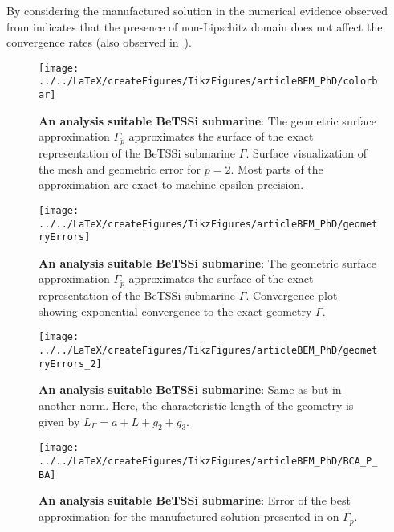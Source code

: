 By considering the manufactured solution in  the numerical evidence observed from  indicates that the presence of non-Lipschitz domain does not affect the convergence rates (also observed in~\cite{Lipton2010roi}).
\begin{figure}
	\centering    
	\texttt{[image: ../../LaTeX/createFigures/TikzFigures/articleBEM\_PhD/colorbar]}
	\caption{\textbf{An analysis suitable BeTSSi submarine}: The geometric surface approximation $\Gamma_{\check{p}}$ approximates the surface of the exact representation of the BeTSSi submarine $\Gamma$. Surface visualization of the mesh and geometric error for $\check{p}=2$. Most parts of the approximation are exact to machine epsilon precision.}
	\label{Fig3:geometricError}
\end{figure}
\begin{figure}
	\centering    
	\texttt{[image: ../../LaTeX/createFigures/TikzFigures/articleBEM\_PhD/geometryErrors]}
	\caption{\textbf{An analysis suitable BeTSSi submarine}: The geometric surface approximation $\Gamma_{\check{p}}$ approximates the surface of the exact representation of the BeTSSi submarine $\Gamma$. Convergence plot showing exponential convergence to the exact geometry $\Gamma$.}
	\label{Fig3:geometricErrorsL2_1}
\end{figure}
\begin{figure}
	\centering    
	\texttt{[image: ../../LaTeX/createFigures/TikzFigures/articleBEM\_PhD/geometryErrors\_2]}
	\caption{\textbf{An analysis suitable BeTSSi submarine}: Same as  but in another norm. Here, the characteristic length of the geometry is given by $L_\Gamma = a+L+g_2+g_3$.}
	\label{Fig3:geometricErrorsL2_2}
\end{figure}
\begin{figure}
	\centering    
	\texttt{[image: ../../LaTeX/createFigures/TikzFigures/articleBEM\_PhD/BCA\_P\_BA]}
	\caption{\textbf{An analysis suitable BeTSSi submarine}: Error of the best approximation for the manufactured solution presented in  on $\Gamma_{\check{p}}$.}
	\label{Fig3:BCA_P_BA}
\end{figure}

